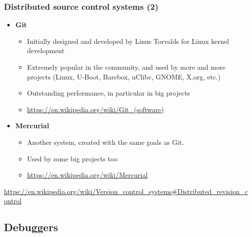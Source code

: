\begin{frame}
  \frametitle{Distributed source control systems (2)}
  \begin{itemize}
  \item {\bf Git}
    \begin{itemize}
    \item Initially designed and developed by Linus Torvalds for Linux
      kernel development
    \item Extremely popular in the community, and used by more and
      more projects (Linux, U-Boot, Barebox, uClibc, GNOME, X.org,
      etc.)
    \item Outstanding performance, in particular in big projects
    \item \url{https://en.wikipedia.org/wiki/Git_(software)}
    \end{itemize}
  \item {\bf Mercurial}
    \begin{itemize}
    \item Another system, created with the same goals as Git.
    \item Used by some big projects too
    \item \url{https://en.wikipedia.org/wiki/Mercurial}
    \end{itemize}
  \end{itemize}
  \url{https://en.wikipedia.org/wiki/Version_control_systems\#Distributed_revision_control}
\end{frame}

\subsection{Debuggers}

